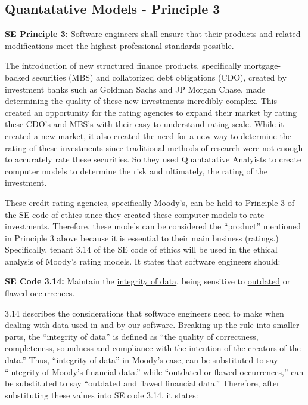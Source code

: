 \documentclass[11pt]{article}
\begin{document}
\begin{multicols}{2}
 
\subsection{Quantatative Models - Principle 3}

\begin{framed}
\noindent
\textbf{SE Principle 3:  }
\newline
Software engineers shall ensure that their products and related modifications meet the highest professional standards possible.
\end{framed}

The introduction of new structured finance products, specifically mortgage-backed securities (MBS) and collatorized debt obligations (CDO), created by investment banks such as Goldman Sachs and JP Morgan Chase, made determining the quality of these new investments incredibly complex. \cite[p.43]{govtReport} This created an opportunity for the rating agencies to expand their market by rating these CDO's and MBS's with their easy to understand rating scale. \cite[p.43]{govtReport}  While it created a new market, it also created the need for a new way to determine the rating of these investments since traditional methods of research were not enough to accurately rate these securities.\cite[p.43]{govtReport}  So they used Quantatative Analyists to create computer models to determine the risk and ultimately, the rating of the investment. \cite{wiredFormula}\cite[p.120]{govtReport}  

These credit rating agencies, specifically Moody's, can be held to Principle 3 of the SE code of ethics since they created these computer models to rate investments.  Therefore, these models can be considered the ``product''\cite{SEcode} mentioned in Principle 3 above because it is essential to their main business (ratings.)  Specifically, tenant 3.14 of the SE code of ethics will be used in the ethical analysis of Moody's rating models.  It states that software engineers should:

\begin{framed}
\noindent
   \textbf{SE Code 3.14: } 
   \newline
   Maintain the \underline{integrity of data}, being sensitive to \underline{outdated} or \underline{flawed occurrences}.
\end{framed}

3.14 describes the considerations that software engineers need to make when dealing with data used in and by our software.  Breaking up the rule into smaller parts, the ``integrity of data'' \cite{SEcode} is defined as ``the quality of correctness, completeness, soundness and compliance with the intention of the creators of the data.'' \cite{dataIntegrityDef} Thus, ``integrity of data'' in Moody's case, can be substituted to say ``integrity of Moody's financial data.'' while ``outdated or flawed occurrences,'' \cite{SEcode} can be substituted to say ``outdated and flawed financial data.''  Therefore, after substituting these values into SE code 3.14, it states:


\end{multicols}
\end{document}
